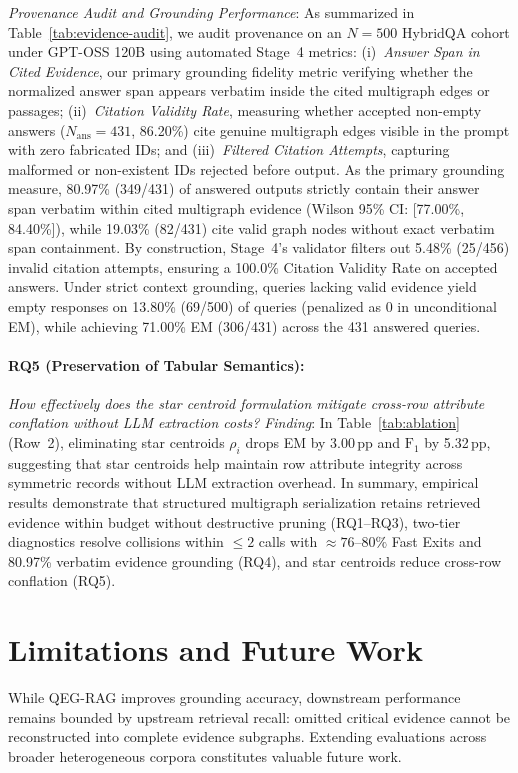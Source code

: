 \documentclass[runningheads]{llncs}
\begin{document}
\emph{Provenance Audit and Grounding Performance}: As summarized in Table~\ref{tab:evidence-audit}, we audit provenance on an $N=500$ HybridQA cohort under GPT-OSS 120B using automated Stage~4 metrics: (i)~\emph{Answer Span in Cited Evidence}, our primary grounding fidelity metric verifying whether the normalized answer span appears verbatim inside the cited multigraph edges or passages; (ii)~\emph{Citation Validity Rate}, measuring whether accepted non-empty answers ($N_{\text{ans}}=431$, 86.20\%) cite genuine multigraph edges visible in the prompt with zero fabricated IDs; and (iii)~\emph{Filtered Citation Attempts}, capturing malformed or non-existent IDs rejected before output. As the primary grounding measure, 80.97\% (349/431) of answered outputs strictly contain their answer span verbatim within cited multigraph evidence (Wilson 95\% CI: [77.00\%, 84.40\%]), while 19.03\% (82/431) cite valid graph nodes without exact verbatim span containment. By construction, Stage~4's validator filters out 5.48\% (25/456) invalid citation attempts, ensuring a 100.0\% Citation Validity Rate on accepted answers. Under strict context grounding, queries lacking valid evidence yield empty responses on 13.80\% (69/500) of queries (penalized as 0 in unconditional EM), while achieving 71.00\% EM (306/431) across the 431 answered queries.

\paragraph{RQ5 (Preservation of Tabular Semantics):}
\emph{How effectively does the star centroid formulation mitigate cross-row attribute conflation without LLM extraction costs?} \emph{Finding}: In Table~\ref{tab:ablation} (Row~2), eliminating star centroids $\rho_i$ drops EM by 3.00\,pp and $\text{F}_1$ by 5.32\,pp, suggesting that star centroids help maintain row attribute integrity across symmetric records without LLM extraction overhead. In summary, empirical results demonstrate that structured multigraph serialization retains retrieved evidence within budget without destructive pruning (RQ1--RQ3), two-tier diagnostics resolve collisions within $\le 2$ calls with $\approx 76\text{--}80\%$ Fast Exits and 80.97\% verbatim evidence grounding (RQ4), and star centroids reduce cross-row conflation (RQ5).

\vspace{-2.5mm}
\section{Limitations and Future Work}
\label{sec:limitations}
\enlargethispage{6.5\baselineskip}
\vspace{-1mm}
While QEG-RAG improves grounding accuracy, downstream performance remains bounded by upstream retrieval recall: omitted critical evidence cannot be reconstructed into complete evidence subgraphs. Extending evaluations across broader heterogeneous corpora constitutes valuable future work.
\end{document}
